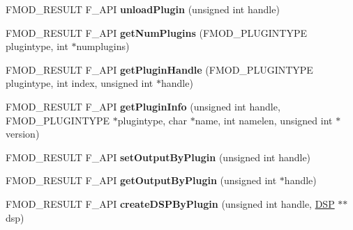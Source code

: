 \begin{DoxyCompactItemize}
\item 
F\+M\+O\+D\+\_\+\+R\+E\+S\+U\+LT F\+\_\+\+A\+PI {\bfseries unload\+Plugin} (unsigned int handle)\hypertarget{class_f_m_o_d_1_1_system_a07ae0f13eb4b291651f34c8fa59d76ff}{}\label{class_f_m_o_d_1_1_system_a07ae0f13eb4b291651f34c8fa59d76ff}

\item 
F\+M\+O\+D\+\_\+\+R\+E\+S\+U\+LT F\+\_\+\+A\+PI {\bfseries get\+Num\+Plugins} (F\+M\+O\+D\+\_\+\+P\+L\+U\+G\+I\+N\+T\+Y\+PE plugintype, int $\ast$numplugins)\hypertarget{class_f_m_o_d_1_1_system_a1a066a03febf0c76a43162e5abc09c7b}{}\label{class_f_m_o_d_1_1_system_a1a066a03febf0c76a43162e5abc09c7b}

\item 
F\+M\+O\+D\+\_\+\+R\+E\+S\+U\+LT F\+\_\+\+A\+PI {\bfseries get\+Plugin\+Handle} (F\+M\+O\+D\+\_\+\+P\+L\+U\+G\+I\+N\+T\+Y\+PE plugintype, int index, unsigned int $\ast$handle)\hypertarget{class_f_m_o_d_1_1_system_aa94d36d0d28721e35ec47fb1ef06ce1f}{}\label{class_f_m_o_d_1_1_system_aa94d36d0d28721e35ec47fb1ef06ce1f}

\item 
F\+M\+O\+D\+\_\+\+R\+E\+S\+U\+LT F\+\_\+\+A\+PI {\bfseries get\+Plugin\+Info} (unsigned int handle, F\+M\+O\+D\+\_\+\+P\+L\+U\+G\+I\+N\+T\+Y\+PE $\ast$plugintype, char $\ast$name, int namelen, unsigned int $\ast$version)\hypertarget{class_f_m_o_d_1_1_system_a68da30ad69d2f9320ddbdc4ced35fec1}{}\label{class_f_m_o_d_1_1_system_a68da30ad69d2f9320ddbdc4ced35fec1}

\item 
F\+M\+O\+D\+\_\+\+R\+E\+S\+U\+LT F\+\_\+\+A\+PI {\bfseries set\+Output\+By\+Plugin} (unsigned int handle)\hypertarget{class_f_m_o_d_1_1_system_a014b2d9623aca816e8054867517067ff}{}\label{class_f_m_o_d_1_1_system_a014b2d9623aca816e8054867517067ff}

\item 
F\+M\+O\+D\+\_\+\+R\+E\+S\+U\+LT F\+\_\+\+A\+PI {\bfseries get\+Output\+By\+Plugin} (unsigned int $\ast$handle)\hypertarget{class_f_m_o_d_1_1_system_a4fc02b0d0253fb9c16427393d25bad59}{}\label{class_f_m_o_d_1_1_system_a4fc02b0d0253fb9c16427393d25bad59}

\item 
F\+M\+O\+D\+\_\+\+R\+E\+S\+U\+LT F\+\_\+\+A\+PI {\bfseries create\+D\+S\+P\+By\+Plugin} (unsigned int handle, \hyperlink{class_f_m_o_d_1_1_d_s_p}{D\+SP} $\ast$$\ast$dsp)\hypertarget{class_f_m_o_d_1_1_system_a3b6b43cfc7eced0c0babf56403d91f6f}{}\label{class_f_m_o_d_1_1_system_a3b6b43cfc7eced0c0babf56403d91f6f}


\end{DoxyCompactItemize}
